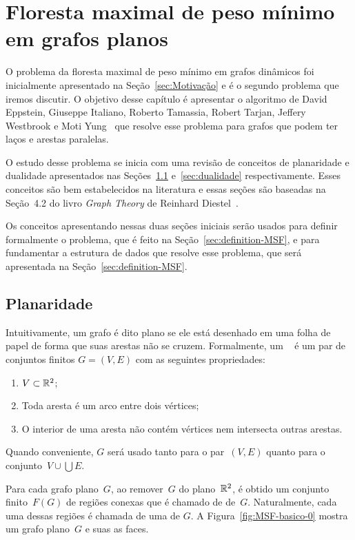 \chapter{Floresta maximal de peso mínimo em grafos planos}
\label{sec:MSF}

O problema da floresta maximal de peso mínimo em grafos dinâmicos foi inicialmente apresentado na Seção~\ref{sec:Motivação} e é o segundo problema que iremos discutir.
O objetivo desse capítulo é apresentar o algoritmo de David Eppstein, Giuseppe Italiano, Roberto Tamassia, Robert Tarjan, Jeffery Westbrook e Moti Yung~\cite{EPPSTEIN-planar} que resolve esse problema para grafos que podem ter laços e arestas paralelas.

O estudo desse problema se inicia com uma revisão de conceitos de planaridade e dualidade apresentados nas Seções~\ref{sec:planaridade} e~\ref{sec:dualidade} respectivamente.
Esses conceitos são bem estabelecidos na literatura e essas seções são baseadas na Seção~4.2 do livro \textit{Graph Theory} de Reinhard Diestel~\cite{Diestel}.

Os conceitos apresentando nessas duas seções iniciais serão usados para definir formalmente o problema, que é feito na Seção~\ref{sec:definition-MSF}, e para fundamentar a estrutura de dados que resolve esse problema, que será apresentada na Seção~\ref{sec:definition-MSF}.

\section{Planaridade}
\label{sec:planaridade}

Intuitivamente, um grafo é dito plano se ele está desenhado em uma folha de papel de forma que suas arestas não se cruzem.
Formalmente, um ~\cite{Diestel} é um par de conjuntos finitos $G = (V, E)$ com as seguintes propriedades:
\begin{enumerate}
\item $V\subset \mathbb{R}^2$;
\item Toda aresta é um arco entre dois vértices;
\item O interior de uma aresta não contém vértices nem intersecta outras arestas.
\end{enumerate}
Quando conveniente, $G$ será usado tanto para o par~$(V ,E)$ quanto para o conjunto~${V\cup\bigcup E}$.

Para cada grafo plano~$G$, ao remover~$G$ do plano~$\mathbb{R}^2$, é obtido um conjunto finito~$F(G)$ de regiões conexas que é chamado de  de~$G$.
Naturalmente, cada uma dessas regiões é chamada de uma  de $G$.
A Figura~\ref{fig:MSF-basico-0} mostra um grafo plano~$G$ e suas as faces.

